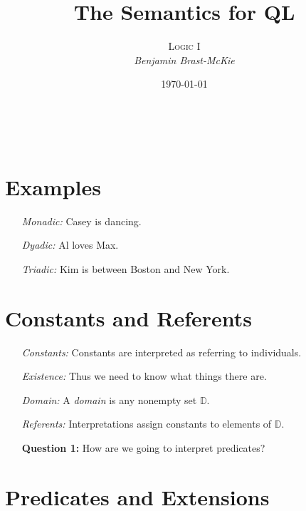\documentclass[a4paper, 11pt]{article} %
\title{\textbf{The Semantics for QL}} %
\author{\textsc{Logic I}\\ \em Benjamin Brast-McKie} %
\date{\today} %
\makeatletter
\newcommand{\D}{\mathbb{D}}
\renewcommand{\maketitle}{ %
\begin{flushright} %
{\LARGE\@title} %

\vspace{10pt} %

{\@author} %
\\\@date %

\vspace{30pt} %
\end{flushright}
}
\makeatother
\begin{document}
\maketitle %

\thispagestyle{empty}


\section*{Examples}%
  \label{sec:Examples}
  
\begin{enumerate}
  \item[\it Monadic:] Casey is dancing.
  \item[\it Dyadic:] Al loves Max.
  \item[\it Triadic:] Kim is between Boston and New York.
\end{enumerate}

\section*{Constants and Referents}%
  \label{sec:Extensions and Referents}
  
\begin{enumerate}
  \item[\it Constants:] Constants are interpreted as referring to individuals.
  \item[\it Existence:] Thus we need to know what things there are.
  \item[\it Domain:] A \textit{domain} is any nonempty set $\D$.
  \item[\it Referents:] Interpretations assign constants to elements of $\D$.
  \item[\bf Question 1:] How are we going to interpret predicates?
\end{enumerate}



\section*{Predicates and Extensions}%
  \label{sec:Extensions}
  
\end{document}
